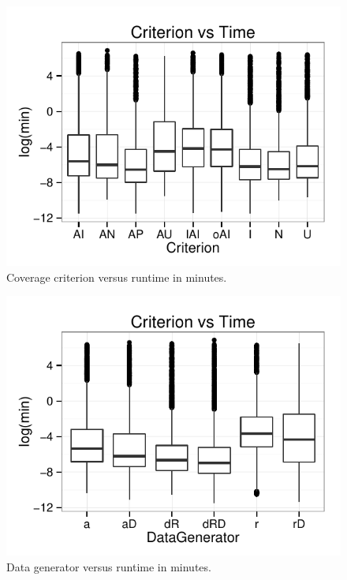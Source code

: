 \begin{figure}
\centering
  \centering
  \includegraphics[width=1\linewidth]{../diagrams/CriterionBoxs.pdf}
  \caption{Coverage criterion versus runtime in minutes.\vspace{-.15in}}
  \label{fig:crites}
  \vspace{-.15in} 
\end{figure}

\begin{figure}
\centering
  \centering
  \includegraphics[width=1\linewidth]{../diagrams/DataGeneratorBoxs.pdf}
  \caption{Data generator versus runtime in minutes.\vspace{-.15in}}
  \label{fig:crites}
  \vspace{-.15in} 
\end{figure}


